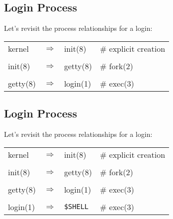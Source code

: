 \documentclass[xga]{xdvislides}
\begin{document}
\subsection{Login Process}
Let's revisit the process relationships for a login:
\vspace*{\fill}
\begin{center}
\begin{tabular}[width=.75\texwidth]{l c l l}
kernel & $\Rightarrow$ & init(8) & \# explicit creation\\
\\
init(8) & $\Rightarrow$ & getty(8) & \# fork(2) \\
\\
getty(8) & $\Rightarrow$ & login(1) & \# exec(3) \\
\end{tabular}
\end{center}
\vspace*{\fill}

\subsection{Login Process}
Let's revisit the process relationships for a login:
\vspace*{\fill}
\begin{center}
\begin{tabular}[width=.75\texwidth]{l c l l}
kernel & $\Rightarrow$ & init(8) & \# explicit creation\\
\\
init(8) & $\Rightarrow$ & getty(8) & \# fork(2) \\
\\
getty(8) & $\Rightarrow$ & login(1) & \# exec(3) \\
\\
login(1) & $\Rightarrow$ & \verb+$SHELL+ & \# exec(3) \\
\end{tabular}
\end{center}
\vspace*{\fill}
\end{document}

